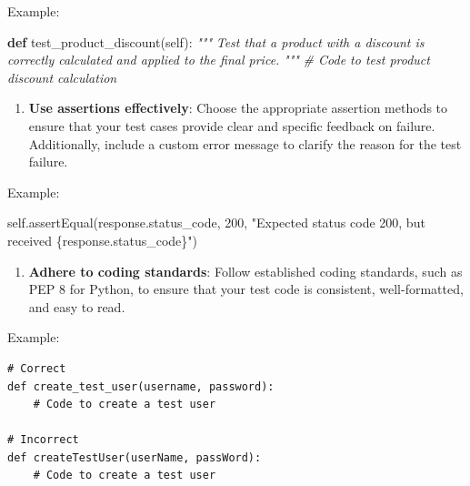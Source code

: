 \documentclass[
  paper=a4,
  ,captions=tableheading
]{scrartcl}
\newenvironment{Shaded}{}{}
\newcommand{\CommentTok}[1]{\textcolor[rgb]{0.38,0.63,0.69}{\textit{#1}}}
\newcommand{\DecValTok}[1]{\textcolor[rgb]{0.25,0.63,0.44}{#1}}
\newcommand{\KeywordTok}[1]{\textcolor[rgb]{0.00,0.44,0.13}{\textbf{#1}}}
\newcommand{\NormalTok}[1]{#1}
\newcommand{\SpecialCharTok}[1]{\textcolor[rgb]{0.25,0.44,0.63}{#1}}
\newcommand{\StringTok}[1]{\textcolor[rgb]{0.25,0.44,0.63}{#1}}
\newcommand{\VariableTok}[1]{\textcolor[rgb]{0.10,0.09,0.49}{#1}}
\providecommand{\tightlist}{%
  \setlength{\itemsep}{0pt}\setlength{\parskip}{0pt}}
\begin{document}
Example:

\begin{Shaded}
\begin{Highlighting}[]

\KeywordTok{def}\NormalTok{ test\_product\_discount(}\VariableTok{self}\NormalTok{):}
    \CommentTok{"""}
\CommentTok{    Test that a product with a discount is correctly calculated}
\CommentTok{    and applied to the final price.}
\CommentTok{    """}
    \CommentTok{\# Code to test product discount calculation}
\end{Highlighting}
\end{Shaded}

\begin{enumerate}
\def\labelenumi{\arabic{enumi}.}
\setcounter{enumi}{3}
\tightlist
\item
  \textbf{Use assertions effectively}: Choose the appropriate assertion
  methods to ensure that your test cases provide clear and specific
  feedback on failure. Additionally, include a custom error message to
  clarify the reason for the test failure.
\end{enumerate}

Example:

\begin{Shaded}
\begin{Highlighting}[]

\VariableTok{self}\NormalTok{.assertEqual(response.status\_code, }\DecValTok{200}\NormalTok{, }\StringTok{"Expected status code 200, but received }\SpecialCharTok{\{response.status\_code\}}\StringTok{"}\NormalTok{)}
\end{Highlighting}
\end{Shaded}

\begin{enumerate}
\def\labelenumi{\arabic{enumi}.}
\setcounter{enumi}{4}
\tightlist
\item
  \textbf{Adhere to coding standards}: Follow established coding
  standards, such as PEP 8 for Python, to ensure that your test code is
  consistent, well-formatted, and easy to read.
\end{enumerate}

Example:

\begin{verbatim}
# Correct
def create_test_user(username, password):
    # Code to create a test user

# Incorrect
def createTestUser(userName, passWord):
    # Code to create a test user
\end{verbatim}
\end{document}
